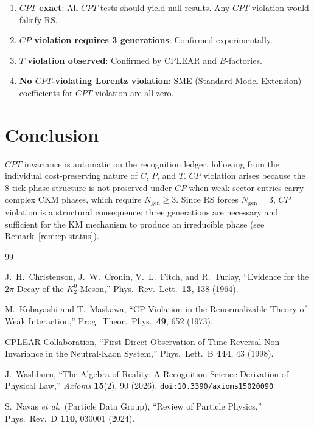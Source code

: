 \documentclass[12pt,a4paper]{article}
\theoremstyle{definition}
\theoremstyle{remark}
\begin{document}
\begin{enumerate}
  \item \textbf{$CPT$ exact}: All $CPT$ tests should yield null
  results.  Any $CPT$ violation would falsify RS.

  \item \textbf{$CP$ violation requires 3 generations}: Confirmed
  experimentally.

  \item \textbf{$T$ violation observed}: Confirmed by CPLEAR and
  $B$-factories.

  \item \textbf{No $CPT$-violating Lorentz violation}: SME
  (Standard Model Extension) coefficients for $CPT$ violation are
  all zero.
\end{enumerate}

\section{Conclusion}
\label{sec:conclusion}

$CPT$ invariance is automatic on the recognition ledger, following
from the individual cost-preserving nature of $C$, $P$, and $T$.
$CP$ violation arises because the 8-tick phase structure is not
preserved under $CP$ when weak-sector entries carry complex CKM
phases, which require $N_{\mathrm{gen}} \geq 3$.  Since RS forces
$N_{\mathrm{gen}} = 3$, $CP$ violation is a structural consequence:
three generations are necessary and sufficient for the KM mechanism
to produce an irreducible phase (see Remark~\ref{rem:cp-status}).

\begin{thebibliography}{99}

J.~H.~Christenson, J.~W.~Cronin, V.~L.~Fitch, and R.~Turlay,
``Evidence for the $2\pi$ Decay of the $K_2^0$ Meson,''
Phys.\ Rev.\ Lett.\ \textbf{13}, 138 (1964).

M.~Kobayashi and T.~Maskawa, ``CP-Violation in the
Renormalizable Theory of Weak Interaction,'' Prog.\ Theor.\
Phys.\ \textbf{49}, 652 (1973).

CPLEAR Collaboration, ``First Direct Observation of
Time-Reversal Non-Invariance in the Neutral-Kaon System,''
Phys.\ Lett.\ B \textbf{444}, 43 (1998).

J.~Washburn, ``The Algebra of Reality: A Recognition Science Derivation
of Physical Law,'' \emph{Axioms} \textbf{15}(2), 90 (2026).
\texttt{doi:10.3390/axioms15020090}

S.~Navas \textit{et al.}\ (Particle Data Group),
``Review of Particle Physics,'' Phys.\ Rev.\ D \textbf{110}, 030001
(2024).

\end{thebibliography}
\end{document}
